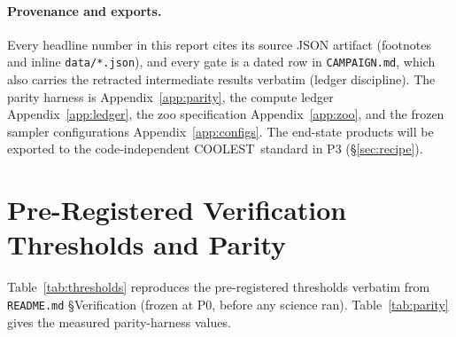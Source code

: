 \documentclass[11pt,letterpaper]{article}
\newcommand{\coolest}{\textsc{COOLEST}}
\begin{document}
\paragraph{Provenance and exports.} Every headline number in this report cites
its source JSON artifact (footnotes and inline \texttt{data/*.json}), and every
gate is a dated row in \texttt{CAMPAIGN.md}, which also carries the retracted
intermediate results verbatim (ledger discipline). The parity harness is
Appendix~\ref{app:parity}, the compute ledger Appendix~\ref{app:ledger}, the
zoo specification Appendix~\ref{app:zoo}, and the frozen sampler configurations
Appendix~\ref{app:configs}. The end-state products will be exported to the
code-independent \coolest\ standard \citep{coolest2023} in P3
(\S\ref{sec:recipe}).

\appendix

\section{Pre-Registered Verification Thresholds and Parity}
\label{sec:thresholds}
\label{app:parity}

Table~\ref{tab:thresholds} reproduces the pre-registered thresholds verbatim
from \texttt{README.md} \S Verification (frozen at P0, before any science ran).
Table~\ref{tab:parity} gives the measured parity-harness values.
\end{document}
